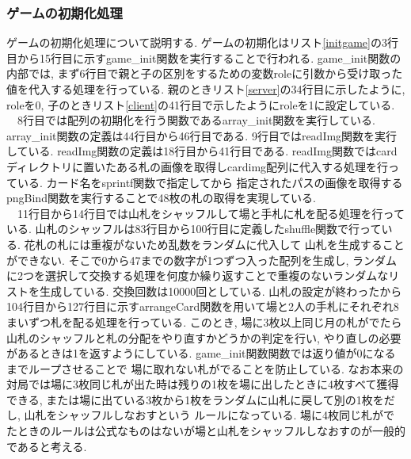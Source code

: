\documentclass[a4j]{jarticle}
\begin{document}
    \subsubsection{ゲームの初期化処理}
    ゲームの初期化処理について説明する. ゲームの初期化はリスト\ref{initgame}の3行目から15行目に示すgame\_init関数を実行することで行われる.
    game\_init関数の内部では, まず6行目で親と子の区別をするための変数roleに引数から受け取った値を代入する処理を行っている. 親のときリスト\ref{server}の34行目に示したように, 
    roleを0, 子のときリスト\ref{client}の41行目で示したようにroleを1に設定している. \\
    　8行目では配列の初期化を行う関数であるarray\_init関数を実行している. array\_init関数の定義は44行目から46行目である. 9行目ではreadImg関数を実行している.
    readImg関数の定義は18行目から41行目である. readImg関数ではcardディレクトリに置いたある札の画像を取得しcardimg配列に代入する処理を行っている. カード名をsprintf関数で指定してから
    指定されたパスの画像を取得するpngBind関数を実行することで48枚の札の取得を実現している.\\
    　11行目から14行目では山札をシャッフルして場と手札に札を配る処理を行っている. 山札のシャッフルは83行目から100行目に定義したshuffle関数で行っている. 花札の札には重複がないため乱数をランダムに代入して
    山札を生成することができない. そこで0から47までの数字が1つずつ入った配列を生成し, ランダムに2つを選択して交換する処理を何度か繰り返すことで重複のないランダムなリストを生成している.
    交換回数は10000回としている. 山札の設定が終わったから104行目から127行目に示すarrangeCard関数を用いて場と2人の手札にそれぞれ8まいずつ札を配る処理を行っている. このとき, 場に3枚以上同じ月の札がでたら
    山札のシャッフルと札の分配をやり直すかどうかの判定を行い, やり直しの必要があるときは1を返すようにしている. game\_init関数関数では返り値が0になるまでループさせることで
    場に取れない札がでることを防止している. なお本来の対局では場に3枚同じ札が出た時は残りの1枚を場に出したときに4枚すべて獲得できる, または場に出ている3枚から1枚をランダムに山札に戻して別の1枚をだし, 山札をシャッフルしなおすという
    ルールになっている. 場に4枚同じ札がでたときのルールは公式なものはないが場と山札をシャッフルしなおすのが一般的であると考える.
\end{document}
